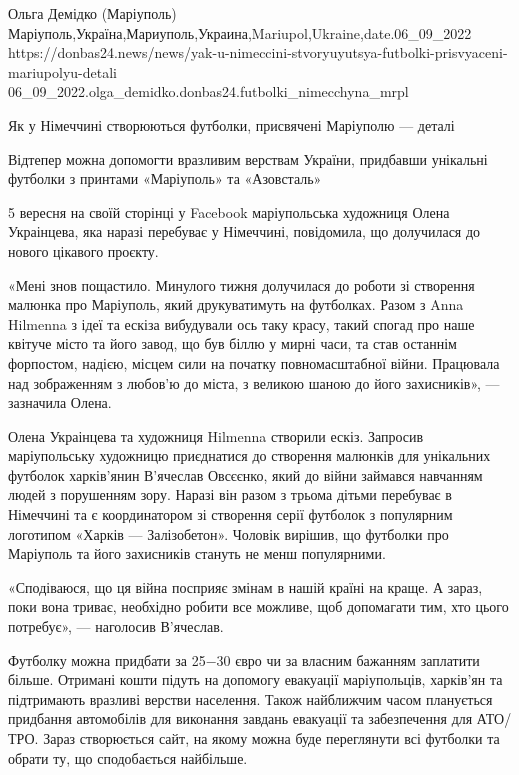  
 
 
 
 

Ольга Демідко (Маріуполь)
Маріуполь,Україна,Мариуполь,Украина,Mariupol,Ukraine,date.06_09_2022
https://donbas24.news/news/yak-u-nimeccini-stvoryuyutsya-futbolki-prisvyaceni-mariupolyu-detali
06_09_2022.olga_demidko.donbas24.futbolki_nimecchyna_mrpl

Як у Німеччині створюються футболки, присвячені Маріуполю — деталі

Відтепер можна допомогти вразливим верствам України, придбавши унікальні
футболки з принтами «Маріуполь» та «Азовсталь»

5 вересня на своїй сторінці у Facebook маріупольська художниця Олена
Украінцева, яка наразі перебуває у Німеччині, повідомила, що долучилася до
нового цікавого проєкту.

«Мені знов пощастило. Минулого тижня долучилася до роботи зі створення малюнка
про Маріуполь, який друкуватимуть на футболках. Разом з Anna Hilmenna з ідеї та
ескіза вибудували ось таку красу, такий спогад про наше квітуче місто та його
завод, що був біллю у мирні часи, та став останнім форпостом, надією, місцем
сили на початку повномасштабної війни. Працювала над зображенням з любов'ю до
міста, з великою шаною до його захисників», — зазначила Олена.

Олена Украінцева та художниця Hilmenna створили ескіз. Запросив маріупольську
художницю приєднатися до створення малюнків для унікальних футболок харків'янин
В'ячеслав Овсєєнко, який до війни займався навчанням людей з порушенням зору.
Наразі він разом з трьома дітьми перебуває в Німеччині та є координатором зі
створення серії футболок з популярним логотипом «Харків — Залізобетон». Чоловік
вирішив, що футболки про Маріуполь та його захисників стануть не менш
популярними.

«Сподіваюся, що ця війна посприяє змінам в нашій країні на краще. А зараз, поки
вона триває, необхідно робити все можливе, щоб допомагати тим, хто цього
потребує», — наголосив В'ячеслав.

Футболку можна придбати за 25−30 євро чи за власним бажанням заплатити більше.
Отримані кошти підуть на допомогу евакуації маріупольців, харків'ян та
підтримають вразливі верстви населення. Також найближчим часом планується
придбання автомобілів для виконання завдань евакуації та забезпечення для
АТО/ТРО. Зараз створюється сайт, на якому можна буде переглянути всі футболки
та обрати ту, що сподобається найбільше.

